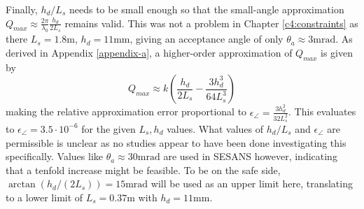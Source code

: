 \documentclass{article}
\begin{document}
Finally, $h_d/L_s$ needs to be small enough so that the small-angle approximation $Q_{max} \approx \frac{2\pi}{\lambda_0}\frac{h_d}{2L_s}$ remains valid. This was not a problem in Chapter \ref{c4:constraints} as there $L_s = 1.8\unit{\meter}$, $h_d = 11\unit{\milli\meter}$, giving an acceptance angle of only $\theta_a \approx 3\unit{\milli\radian}$. As derived in Appendix \ref{appendix-a}, a higher-order approximation of $Q_{max}$ is given by
$$Q_{max} \approx  k(\frac{h_d}{2L_s} - \frac{3h_d^3}{64L_s^3})$$
making the relative approximation error proportional to $\epsilon_\angle = \frac{3h_d^2}{32L_s^2}$. This evaluates to $\epsilon_\angle = 3.5 \cdot 10^{-6}$ for the given $L_s, h_d$ values. What values of $h_d/L_s$ and $\epsilon_\angle$ are permissible is unclear as no studies appear to have been done investigating this specifically. Values like $\theta_a \approx 30\unit{\milli\radian}$ are used in SESANS \cite{rekveldt1996} however, indicating that a tenfold increase might be feasible. To be on the safe side, $\arctan\left(h_d / (2L_s)\right) = 15\unit{\milli\radian}$ will be used as an upper limit here, translating to a lower limit of $L_s = 0.37\unit{\meter}$ with $h_d = 11\unit{\milli\meter}$.

\end{document}
